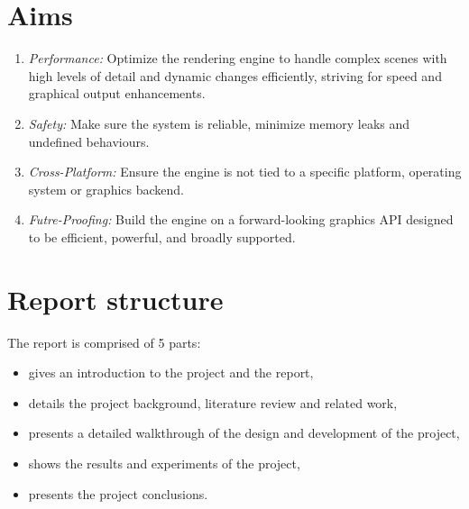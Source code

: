 \section{Aims}
\label{aims}
\begin{enumerate}
\item \emph{Performance:} Optimize the rendering engine to handle complex scenes with high levels of detail and dynamic changes efficiently, striving for speed and graphical output enhancements.
  \item \emph{Safety:} Make sure the system is reliable, minimize memory leaks and undefined behaviours.
  \item \emph{Cross-Platform:} Ensure the engine is not tied to a specific platform, operating system or graphics backend.
  \item \emph{Futre-Proofing:} Build the engine on a forward-looking graphics API designed to be efficient, powerful, and broadly supported.
\end{enumerate}

\section{Report structure}
The report is comprised of 5 parts:

\begin{itemize}
    \item {} gives an introduction to the project and the report,
    \item {} details the project background, literature review and related work,
    \item {} presents a detailed walkthrough of the design and development of the project,
    \item {} shows the results and experiments of the project,
    \item {} presents the project conclusions.
\end{itemize}

